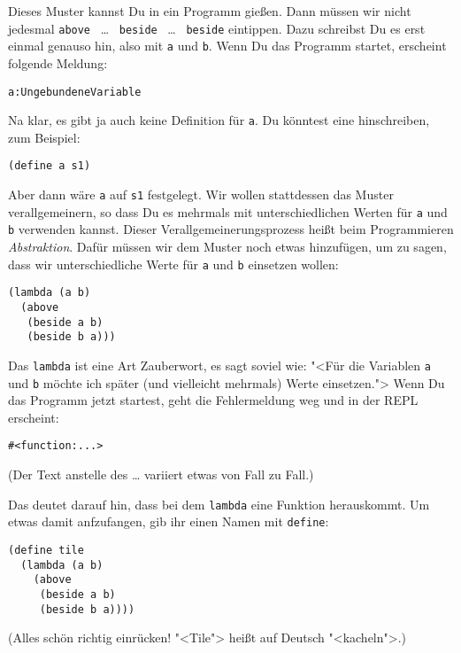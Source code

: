 Dieses Muster kannst Du in ein Programm gießen.  Dann müssen wir nicht
jedesmal \lstinline{above} ~\ldots~ \lstinline{beside} ~\ldots~ \lstinline{beside} eintippen.
Dazu schreibst Du es erst einmal genauso hin, also mit \lstinline{a} und
\lstinline{b}.  Wenn Du das Programm startet, erscheint folgende Meldung:
%
\begin{alltt}
\color{red}a: Ungebundene Variable
\end{alltt}
%
Na klar, es gibt ja auch keine Definition für \lstinline{a}.  Du könntest
eine hinschreiben, zum Beispiel:
%
\begin{lstlisting}
(define a s1)
\end{lstlisting}
%
Aber dann wäre \lstinline{a} auf \lstinline{s1} festgelegt.  Wir wollen
stattdessen das Muster verallgemeinern, so dass Du es mehrmals mit
unterschiedlichen Werten für \lstinline{a} und \lstinline{b} verwenden
kannst.  Dieser Verallgemeinerungsprozess heißt beim Programmieren
\textit{Abstraktion}.  Dafür müssen wir dem Muster
noch etwas hinzufügen, um zu sagen, dass wir unterschiedliche Werte
für \lstinline{a} und \lstinline{b} einsetzen wollen:
%
\begin{lstlisting}
(lambda (a b)
  (above
   (beside a b)
   (beside b a)))
\end{lstlisting}
%
Das \lstinline{lambda} ist eine Art Zauberwort, es sagt soviel wie: "<Für
die Variablen \lstinline{a} und \lstinline{b} möchte ich später (und
vielleicht mehrmals) Werte einsetzen.">  Wenn Du das Programm jetzt
startest, geht die Fehlermeldung weg und in der REPL erscheint:
%
\begin{lstlisting}
#<function:...>
\end{lstlisting}
%
(Der Text anstelle des \ldots{} variiert etwas von Fall zu Fall.)

Das deutet darauf hin, dass bei dem \lstinline{lambda} eine Funktion
herauskommt.  Um etwas damit anfzufangen, gib ihr einen Namen mit
\lstinline{define}:
%
\begin{lstlisting}
(define tile
  (lambda (a b)
    (above
     (beside a b)
     (beside b a))))
\end{lstlisting}
%
(Alles schön richtig einrücken! "<Tile"> heißt auf Deutsch
"<kacheln">.)

